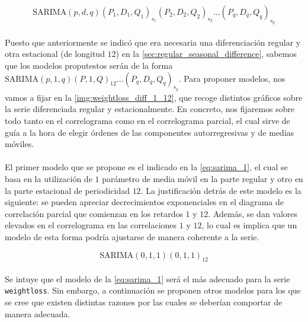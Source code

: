 \documentclass[a4paper, spanish]{article}
\begin{document}
      \begin{equation}
      \label{eq:sarima}
        \text{SARIMA}(p, d, q)(P_1, D_1, Q_1)_{s_1}(P_2, D_2, Q_2)_{s_2}...(P_q, D_q, Q_q)_{s_q}
      \end{equation}

      \paragraph{}
      Puesto que anteriormente se indicó que era necesaria una diferenciación regular y otra estacional (de longitud $12$) en la \autoref{sec:regular_seasonal_difference}, sabemos que los modelos proputestos serán de la forma $\text{SARIMA}(p, 1, q)(P, 1, Q)_{12}...(P_q, D_q, Q_q)_{s_q}$. Para proponer modelos, nos vamos a fijar en la \autoref{img:weightloss_diff_1_12}, que recoge distintos gráficos sobre la serie diferenciada regular y estacionalmente. En concreto, nos fijaremos sobre todo tanto en el correlograma como en el correlograma parcial, el cual sirve de guía a la hora de elegir órdenes de las componentes autorregresivas y de medias móviles.

      \paragraph{}
      El primer modelo que se propone es el indicado en la \autoref{eq:sarima_1}, el cual se basa en la utilización de $1$ parámetro de media móvil en la parte regular y otro en la parte estacional de periodicidad $12$. La justificación detrás de este modelo es la siguiente: se pueden apreciar decrecimientos exponenciales en el diagrama de correlación parcial que comienzan en los retardos $1$ y $12$. Además, se dan valores elevados en el correlograma en las correlaciones $1$ y $12$, lo cual es implica que un modelo de esta forma podría ajustarse de manera coherente a la serie.

      \begin{equation}
        \label{eq:sarima_1}
        \text{SARIMA}(0, 1, 1)(0, 1, 1)_{12}
      \end{equation}

      \paragraph{}
      Se intuye que el modelo de la \autoref{eq:sarima_1} será el más adecuado para la serie \texttt{weightloss}. Sin embargo, a continuación se proponen otros modelos para los que se cree que existen distintas razones por las cuales se deberían comportar de manera adecuada.
\end{document}
